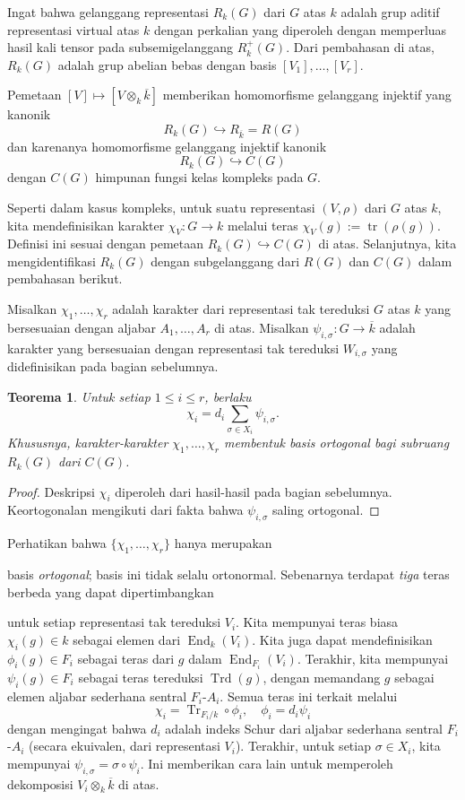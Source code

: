 \documentclass[12pt]{article}
\theoremstyle{plain}
\newtheorem{theorem}{Teorema}[section]
\theoremstyle{definition}
\theoremstyle{remark}
\numberwithin{equation}{section}
\begin{document}
Ingat bahwa gelanggang representasi $R_k(G)$ dari $G$ atas $k$
adalah grup aditif representasi virtual atas $k$
dengan perkalian yang diperoleh dengan memperluas hasil kali tensor
pada subsemigelanggang $R_k^+(G)$.
Dari pembahasan di atas, $R_k(G)$ adalah grup abelian bebas
dengan basis $[V_1],\ldots,[V_r]$.

Pemetaan $[V] \mapsto [V \otimes_k \overline{k}]$
memberikan homomorfisme gelanggang injektif yang kanonik
\[
R_k(G) \hookrightarrow R_{\overline{k}} = R(G)
\]
dan karenanya homomorfisme gelanggang injektif kanonik
\[
R_k(G) \hookrightarrow C(G)
\]
dengan $C(G)$ himpunan fungsi kelas kompleks pada $G$.

Seperti dalam kasus kompleks, untuk suatu representasi $(V,\rho)$
dari $G$ atas $k$, kita mendefinisikan karakter
$\chi_V : G \to k$
melalui teras $\chi_V(g) := \operatorname{tr}(\rho(g))$.
Definisi ini sesuai dengan pemetaan $R_k(G) \hookrightarrow C(G)$ di atas.
Selanjutnya, kita mengidentifikasi $R_k(G)$ dengan subgelanggang dari $R(G)$ dan $C(G)$
dalam pembahasan berikut.

Misalkan $\chi_1,\ldots,\chi_r$ adalah karakter dari representasi tak tereduksi $G$
atas $k$ yang bersesuaian dengan aljabar $A_1,\ldots, A_r$ di atas.
Misalkan $\psi_{i,\sigma} : G \to \overline{k}$ adalah karakter
yang bersesuaian dengan representasi tak tereduksi $W_{i,\sigma}$
yang didefinisikan pada bagian sebelumnya.

\begin{theorem}
Untuk setiap $1 \le i \le r$, berlaku
\[
\chi_i = d_i \sum_{\sigma \in X_i} \psi_{i,\sigma} .
\]
Khususnya, karakter-karakter $\chi_1,\ldots, \chi_r$
membentuk basis ortogonal bagi subruang $R_k(G)$ dari $C(G)$.
\end{theorem}

\begin{proof}
Deskripsi $\chi_i$ diperoleh dari hasil-hasil pada bagian sebelumnya.
Keortogonalan mengikuti dari fakta bahwa $\psi_{i,\sigma}$
saling ortogonal.
\end{proof}
Perhatikan bahwa $\{\chi_1,\ldots,\chi_r\}$ hanya merupakan

basis \emph{ortogonal}; basis ini tidak selalu ortonormal.
Sebenarnya terdapat \emph{tiga} teras berbeda yang dapat dipertimbangkan

untuk setiap representasi tak tereduksi $V_i$.
Kita mempunyai teras biasa $\chi_i(g) \in k$ sebagai elemen dari
$\operatorname{End}_k(V_i)$.
Kita juga dapat mendefinisikan $\phi_i(g) \in F_i$ sebagai teras dari $g$ dalam
$\operatorname{End}_{F_i}(V_i)$.
Terakhir, kita mempunyai $\psi_i(g) \in F_i$ sebagai teras tereduksi
$\operatorname{Trd}(g)$, dengan memandang $g$ sebagai elemen aljabar sederhana sentral
$F_i$-$A_i$.
Semua teras ini terkait melalui
\[
\chi_i = \operatorname{Tr}_{F_i/k} \circ \phi_i, \quad
\phi_i = d_i \psi_i
\]
dengan mengingat bahwa $d_i$ adalah indeks Schur dari aljabar sederhana sentral
$F_i$-$A_i$ (secara ekuivalen, dari representasi $V_i$).
Terakhir, untuk setiap $\sigma \in X_i$, kita mempunyai $\psi_{i,\sigma} = \sigma
\circ \psi_i$.
Ini memberikan cara lain untuk memperoleh dekomposisi $V_i \otimes_k
\overline{k}$ di atas.
\end{document}
